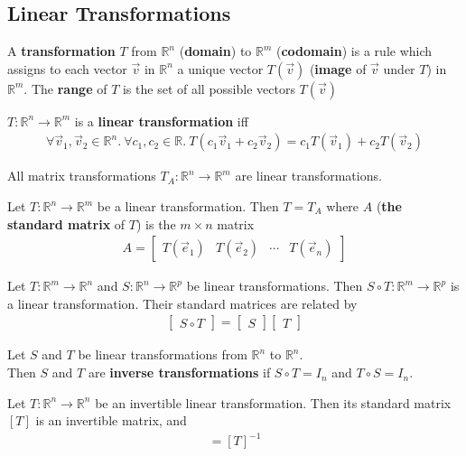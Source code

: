 \documentclass{article}
\begin{document}
\subsection{Linear Transformations}
\begin{definition}
	A \textbf{transformation} $T$ from $\mathbb{R}^n$ (\textbf{domain}) to $\mathbb{R}^m$ (\textbf{codomain}) is a rule which assigns to each vector $\vec v$ in $\mathbb{R}^n$ a unique vector $T(\vec v)$ (\textbf{image} of $\vec v$ under $T$) in $\mathbb{R}^m$.
	The \textbf{range} of $T$ is the set of all possible vectors $T(\vec v)$
\end{definition}
\begin{definition}
	$T:\mathbb{R}^n \to \mathbb{R}^m$ is a \textbf{linear transformation} iff
	\begin{align*}
		\forall \vec v_1, \vec v_2 \in \mathbb{R}^n.\:\forall c_1, c_2 \in \mathbb{R}.\: T(c_1\vec v_1 + c_2\vec v_2) = c_1T(\vec v_1) + c_2T(\vec v_2)
	\end{align*}
\end{definition}
\begin{theorem}
	All matrix transformations $T_A:\mathbb{R}^n\to\mathbb{R}^m$ are linear transformations.
\end{theorem}
\begin{theorem}
	Let $T:\mathbb{R}^n\to\mathbb{R}^m$ be a linear transformation. Then $T=T_A$ where $A$ (\textbf{the standard matrix} of $T$) is the $m\times n$ matrix
	\begin{align*}
		A = \begin{bmatrix}
			T(\vec e_1) & T(\vec e_2) & \cdots & T(\vec e_n)
		\end{bmatrix}
	\end{align*}
\end{theorem}
\begin{theorem}
	Let $T:\mathbb{R}^m\to\mathbb{R}^n$ and $S:\mathbb{R}^n\to\mathbb{R}^p$ be linear transformations. Then $S\circ T:\mathbb{R}^m\to\mathbb{R}^p$ is a linear transformation. Their standard matrices are related by
	\begin{align*}
		\begin{bmatrix}
			S\circ T
		\end{bmatrix}
		= \begin{bmatrix}
			S
		\end{bmatrix}
		\begin{bmatrix}
			T
		\end{bmatrix}
	\end{align*}
\end{theorem}
\begin{definition}
	Let $S$ and $T$ be linear transformations from $\mathbb{R}^n$ to $\mathbb{R}^n$.\\
	Then $S$ and $T$ are \textbf{inverse transformations} if $S\circ T= I_n$ and $T\circ S=I_n$.
\end{definition}
\begin{theorem}
	Let $T:\mathbb{R}^n\to\mathbb{R}^n$ be an invertible linear transformation. Then its standard matrix $[T]$ is an invertible matrix, and
	\begin{gather*}
		[T^{-1}] = [T]^{-1}
	\end{gather*}
\end{theorem}
\end{document}
